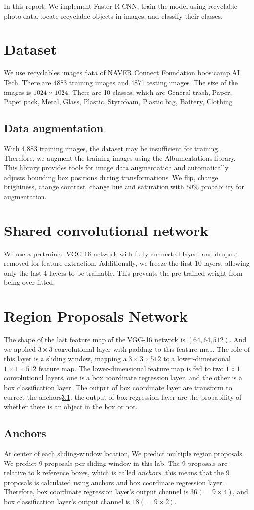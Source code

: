 \documentclass[extendedabs]{bmvc2k}
\begin{document}
In this report, We implement Faster R-CNN\cite{fasterrcnn},  train the model using recyclable photo data, locate recyclable objects in images, and classify their classes.
\section{Dataset}
We use recyclables images data of NAVER Connect Foundation boostcamp AI Tech. There are 4883 training images and 4871 testing images. The size of the images is $1024\times1024$. There are 10 classes, which are General trash, Paper, Paper pack, Metal, Glass, Plastic, Styrofoam, Plastic bag, Battery, Clothing.
\subsection{Data augmentation}
With 4,883 training images, the dataset may be insufficient for training. Therefore, we augment the training images using the Albumentations library. This library provides tools for image data augmentation and automatically adjusts bounding box positions during transformations. We flip, change brightness, change contrast, change hue and saturation with 50\% probability for augmentation.
\section{Shared convolutional network}
We use a pretrained VGG-16 network with fully connected layers and dropout removed for feature extraction. Additionally, we freeze the first 10 layers, allowing only the last 4 layers to be trainable. This prevents the pre-trained weight from being over-fitted.
\section{Region Proposals Network}
The shape of the last feature map of the VGG-16 network is $(64,64,512)$. And we applied $3\times3$ convolutional layer with padding to this feature map. The role of this layer is a sliding window, mapping a $3\times3\times512$ to a lower-dimensional $1\times1\times512$ feature map. The lower-dimensional feature map is fed to two $1\times1$ convolutional layers. one is a box coordinate regression layer, and the other is a box classification layer. The output of box coordinate layer are transform to currect the anchors\ref{anchor}. the output of box regression layer are the probability of whether there is an object in the box or not.
\subsection{Anchors} \label{anchor}
At center of each sliding-window location, We predict multiple region proposals. We predict 9 proposals per sliding window in this lab. The 9 proposals are relative to k reference boxes, which is called \textit{anchors}. this means that the 9 proposals is calculated using anchors and box coordinate regression layer. Therefore, box coordinate regression layer's output channel is $36(=9\times4)$, and box classification layer's output channel is $18(=9\times2)$.
\end{document}
